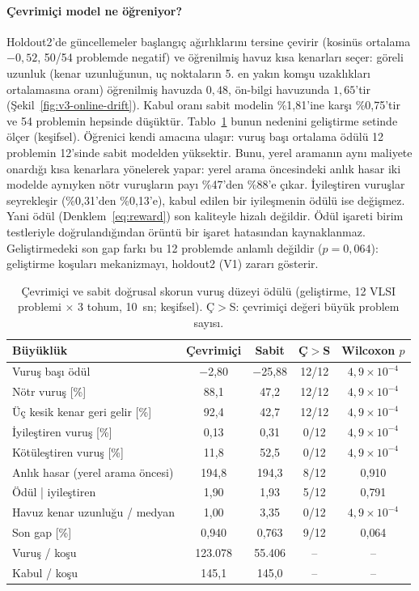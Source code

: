 \documentclass[pdflatex,sn-basic]{sn-jnl}
\begin{document}
\paragraph{Çevrimiçi model ne öğreniyor?}
Holdout2'de güncellemeler başlangıç ağırlıklarını tersine çevirir (kosinüs ortalama $-0{,}52$,
50/54 problemde negatif) ve öğrenilmiş havuz kısa kenarları seçer: göreli uzunluk (kenar
uzunluğunun, uç noktaların 5. en yakın komşu uzaklıkları ortalamasına oranı) öğrenilmiş havuzda
$0{,}48$, ön-bilgi havuzunda $1{,}65$'tir (Şekil~\ref{fig:v3-online-drift}).
Kabul oranı sabit modelin \%1,81'ine karşı \%0,75'tir ve 54 problemin hepsinde düşüktür.
Tablo~\ref{tab:v3-online-reward} bunun nedenini geliştirme setinde ölçer (keşifsel). Öğrenici kendi
amacına ulaşır: vuruş başı ortalama ödülü 12 problemin 12'sinde sabit modelden yüksektir.
Bunu, yerel aramanın aynı maliyete onardığı kısa kenarlara yönelerek yapar: yerel arama öncesindeki
anlık hasar iki modelde aynıyken nötr vuruşların payı \%47'den \%88'e çıkar.
İyileştiren vuruşlar seyrekleşir (\%0,31'den \%0,13'e), kabul edilen bir iyileşmenin ödülü ise
değişmez.
Yani ödül (Denklem~\eqref{eq:reward}) son kaliteyle hizalı değildir. Ödül işareti birim testleriyle
doğrulandığından örüntü bir işaret hatasından kaynaklanmaz.
Geliştirmedeki son gap farkı bu 12 problemde anlamlı değildir ($p=0{,}064$): geliştirme koşuları
mekanizmayı, holdout2 (V1) zararı gösterir.

\begin{table}[!htbp]
\centering\small\setlength{\tabcolsep}{3pt}
\caption{Çevrimiçi ve sabit doğrusal skorun vuruş düzeyi ödülü (geliştirme, 12 VLSI problemi $\times$ 3 tohum, 10~sn; keşifsel). Ç$>$S: çevrimiçi değeri büyük problem sayısı.}
\label{tab:v3-online-reward}
\begin{tabular*}{\textwidth}{@{\extracolsep{\fill}}lcccc}
\toprule
Büyüklük & Çevrimiçi & Sabit & Ç$>$S & Wilcoxon $p$ \\
\midrule
Vuruş başı ödül & $-$2{,}80 & $-$25{,}88 & 12/12 & $4{,}9\times10^{-4}$ \\
Nötr vuruş [\%] & 88{,}1 & 47{,}2 & 12/12 & $4{,}9\times10^{-4}$ \\
Üç kesik kenar geri gelir [\%] & 92{,}4 & 42{,}7 & 12/12 & $4{,}9\times10^{-4}$ \\
İyileştiren vuruş [\%] & 0{,}13 & 0{,}31 & 0/12 & $4{,}9\times10^{-4}$ \\
Kötüleştiren vuruş [\%] & 11{,}8 & 52{,}5 & 0/12 & $4{,}9\times10^{-4}$ \\
Anlık hasar (yerel arama öncesi) & 194{,}8 & 194{,}3 & 8/12 & 0{,}910 \\
Ödül | iyileştiren & 1{,}90 & 1{,}93 & 5/12 & 0{,}791 \\
Havuz kenar uzunluğu / medyan & 1{,}00 & 3{,}35 & 0/12 & $4{,}9\times10^{-4}$ \\
\midrule
Son gap [\%] & 0{,}940 & 0{,}763 & 9/12 & 0{,}064 \\
Vuruş / koşu & 123.078 & 55.406 & -- & -- \\
Kabul / koşu & 145{,}1 & 145{,}0 & -- & -- \\
\bottomrule
\end{tabular*}
\end{table}
\end{document}
